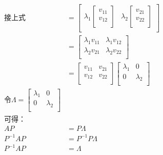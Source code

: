 \documentclass[12pt, a4paper, oneside]{ctexbook}
\begin{document}
\begin{align}
    \mbox{接上式}
    &=
    \left[
        \begin{matrix}
            \lambda_1
            \left[
                \begin{matrix}
                    v_{11} \\ v_{12} \\
                \end{matrix}
            \right] &
            \lambda_2
            \left[
                \begin{matrix}
                    v_{21} \\ v_{22} \\
                \end{matrix}
            \right] \\
        \end{matrix}
    \right]
    \nonumber
    \\
    &=
    \left[
        \begin{matrix}
            \lambda_1v_{11} & \lambda_1v_{12} \\
            \lambda_2v_{21} & \lambda_2v_{22} \\
        \end{matrix}
    \right]
    \nonumber
    \\
    &=
    \left[
        \begin{matrix}
            v_{11} & v_{21} \\
            v_{12} & v_{22} \\
        \end{matrix}
    \right]
    \left[
        \begin{matrix}
            \lambda_1 & 0 \\
            0 & \lambda_2 \\
        \end{matrix}
    \right]
    \nonumber
    \\
    \mbox{令}\Lambda=
    \left[
        \begin{matrix}
            \lambda_1 & 0 \\
            0 & \lambda_2 \\
        \end{matrix}
    \right]
    \nonumber
    \\
    \mbox{可得：}
    \nonumber
    \\
    AP&=P\Lambda
    \nonumber
    \\
    P^{-1}AP&=P^{-1}P\Lambda
    \nonumber
    \\
    P^{-1}AP&=\Lambda
    \nonumber
\end{align}
\end{document}
